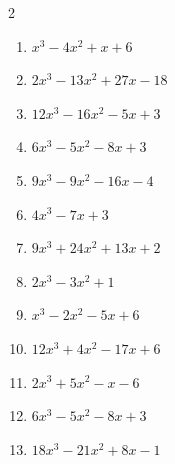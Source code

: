 \begin{multicols}{2}
\begin{enumerate}
\resetques

  \item $x^{3}-4x^{2}+x+6$

        \phantom{$=(x+1)(x-2)(x-3)$}

  \item $2x^{3}-13x^{2}+27x-18$

        \phantom{$=(2x-3)(x-2)(x-3)$}

  \item $12x^{3}-16x^{2}-5x+3$

        \phantom{$=(2x+1)(2x-3)(3x-1)$}

  \item $6x^{3}-5x^{2}-8x+3$

        \phantom{$=(2x-3)(3x-1)(x+1)$}

  \item $9x^{3}-9x^{2}-16x-4$

        \phantom{$=(3x+1)(3x+2)(x-2)$}

\columnbreak %

  \item $4x^{3}-7x+3$

        \phantom{$=(2x+3)(2x-1)(x-1)$}

  \item $9x^{3}+24x^{2}+13x+2$


  \item $2x^{3}-3x^{2}+1$


  \item $x^{3}-2x^{2}-5x+6$

        \phantom{$=(x+2)(x-1)(x-3)$}

  \item $12x^{3}+4x^{2}-17x+6$

        \phantom{$=(2x+3)(2x-1)(3x-2)$}

\columnbreak %

\resetques

  \item $2x^{3}+5x^{2}-x-6$

        \phantom{$=(2x+3)(x+2)(x-1)$}

  \item $6x^{3}-5x^{2}-8x+3$

        \phantom{$=(2x-3)(3x-1)(x+1)$}

  \item $18x^{3}-21x^{2}+8x-1$


\end{enumerate}
\end{multicols}
